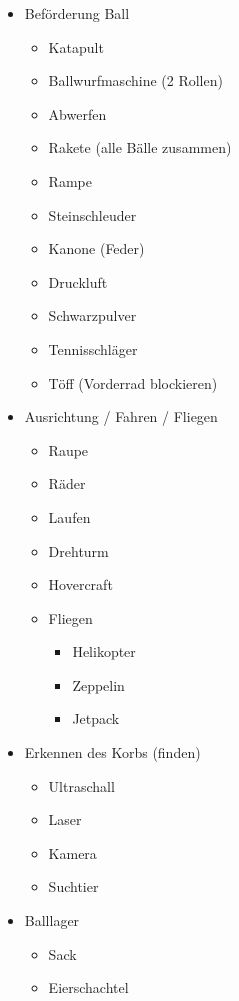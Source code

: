 \documentclass[a4paper,10pt,fleqn]{article}
\begin{document}
\begin{itemize}
    \item Beförderung Ball
    \begin{itemize}
        \item Katapult
        \item Ballwurfmaschine (2 Rollen)
        \item Abwerfen
        \item Rakete (alle Bälle zusammen)
        \item Rampe
        \item Steinschleuder
        \item Kanone (Feder)
        \item Druckluft
        \item Schwarzpulver
        \item Tennisschläger
        \item Töff (Vorderrad blockieren)
    \end{itemize}
    \item Ausrichtung / Fahren / Fliegen
    \begin{itemize}
        \item Raupe
        \item Räder
        \item Laufen
        \item Drehturm
        \item Hovercraft
        \item Fliegen
        \begin{itemize}
            \item Helikopter
            \item Zeppelin
            \item Jetpack
        \end{itemize}
    \end{itemize}
    \item Erkennen des Korbs (finden)
    \begin{itemize}
        \item Ultraschall
        \item Laser
        \item Kamera
        \item Suchtier
    \end{itemize}
    \item Balllager
    \begin{itemize}
        \item Sack
        \item Eierschachtel

\end{itemize}
\end{itemize}
\end{document}

